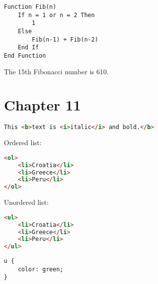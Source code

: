 \documentclass[]{memoir}
\begin{document}
\begin{lstlisting}
Function Fib(n)
    If n = 1 or n = 2 Then
        1
    Else
        Fib(n-1) + Fib(n-2)
    End If
End Function
\end{lstlisting}

The 15th Fibonacci number is 610.

\section{Chapter 11}


\begin{lstlisting}[language=HTML]
This <b>text is <i>italic</i> and bold.</b>
\end{lstlisting}


Ordered list:

\begin{lstlisting}[language=HTML]
<ol>
    <li>Croatia</li>
    <li>Greece</li>
    <li>Peru</li>
</ol>
\end{lstlisting}

Unordered list:

\begin{lstlisting}[language=HTML]
<ul>
    <li>Croatia</li>
    <li>Greece</li>
    <li>Peru</li>
</ul>
\end{lstlisting}


\begin{lstlisting}
u {
    color: green;
}
\end{lstlisting}

\end{document}
